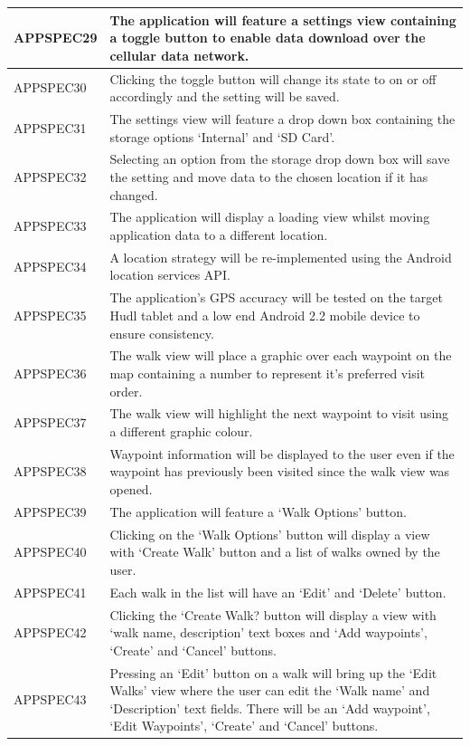 \documentclass[11pt,a4paper]{article}
\begin{document}
\begin{longtable}{|p{2.5cm}p{13cm}|}
APPSPEC29 & The application will feature a settings view containing a toggle button to enable data download over the cellular data network. \\ \hline
APPSPEC30 & Clicking the toggle button will change its state to on or off accordingly and the setting will be saved. \\ \hline
APPSPEC31 & The settings view will feature a drop down box containing the storage options `Internal' and `SD Card'. \\ \hline
APPSPEC32 & Selecting an option from the storage drop down box will save the setting and move data to the chosen location if it has changed. \\ \hline
APPSPEC33 & The application will display a loading view whilst moving application data to a different location. \\ \hline
APPSPEC34 & A location strategy will be re-implemented using the Android location services API. \\ \hline
APPSPEC35 & The application's GPS accuracy will be tested on the target Hudl tablet and a low end Android 2.2 mobile device to ensure consistency. \\ \hline
APPSPEC36 & The walk view will place a graphic over each waypoint on the map containing a number to represent it's preferred visit order. \\ \hline
APPSPEC37 & The walk view will highlight the next waypoint to visit using a different graphic colour. \\ \hline
APPSPEC38 & Waypoint information will be displayed to the user even if the waypoint has previously been visited since the walk view was opened. \\ \hline
APPSPEC39 & The application will feature a `Walk Options' button.\\ \hline
APPSPEC40 & Clicking on the `Walk Options' button will display a view with `Create Walk' button and a list of walks owned by the user. \\ \hline
APPSPEC41 & Each walk in the list will have an `Edit' and `Delete' button.\\ \hline
APPSPEC42 & Clicking the `Create Walk? button will display a view with `walk name, description' text boxes and `Add waypoints', `Create' and `Cancel' buttons.\\ \hline
APPSPEC43 & Pressing an `Edit' button on a walk will bring up the `Edit Walks' view where the user can edit the `Walk name' and `Description' text fields. There will be an `Add waypoint', `Edit Waypoints', `Create' and `Cancel' buttons. \\ \hline

\end{longtable}
\end{document}
